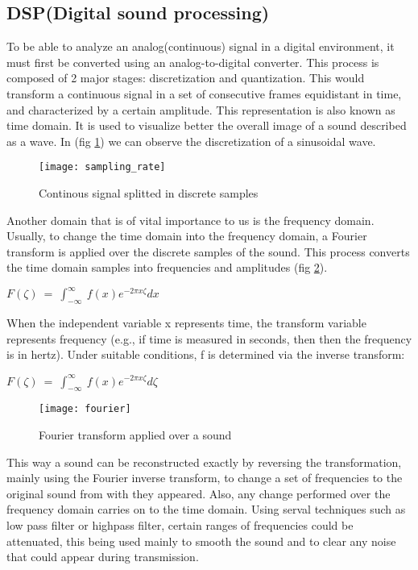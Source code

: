 \documentclass[12pt]{report}
\begin{document}
\subsection{DSP(Digital sound processing)}
To be able to analyze an analog(continuous) signal in a digital environment, it must first be converted using an analog-to-digital converter. This process is composed of 2 major stages: discretization and quantization. This would transform a continuous signal in a set of consecutive frames equidistant in time, and characterized by a certain amplitude. This representation is also known as time domain. It is used to visualize better the overall image of a sound described as a wave. In (fig \ref{fig:samp_rate}) we can observe the discretization of a sinusoidal wave.

\begin{figure}
\centering
\texttt{[image: sampling\_rate]}
\caption{Continous signal splitted in discrete samples}
\label{fig:samp_rate}
\end{figure}

Another domain that is of vital importance to us is the frequency domain. Usually, to change the time domain into the frequency domain, a Fourier transform is applied over the discrete samples of the sound. This process converts the time domain samples into frequencies and amplitudes (fig \ref{fig:fourier}).

\begin{center}
\begin{math}
F\left(\zeta \right)\:=\:\int _{-\infty }^{\infty }\:f\left(x\right)e^{-2\pi x\zeta }dx
\end{math}
\end{center}

When the independent variable x represents time, the transform variable represents frequency (e.g., if time is measured in seconds, then then the frequency is in hertz). Under suitable conditions, f is determined via the inverse transform: 
\begin{center}
\begin{math}
F\left(\zeta \right)\:=\:\int _{-\infty }^{\infty }\:f\left(x\right)e^{-2\pi x\zeta } d\zeta
\end{math}
\end{center}
\begin{figure}[!h]
\centering
\texttt{[image: fourier]}
\caption{Fourier transform applied over a sound}
\label{fig:fourier}
\end{figure}
This way a sound can be reconstructed exactly by reversing the transformation, mainly using the Fourier inverse transform, to change a set of frequencies to the original sound from with they appeared. Also, any change performed over the frequency domain carries on to the time domain. Using serval techniques such as low pass filter or highpass filter, certain ranges of frequencies could be attenuated, this being used mainly to smooth the sound and to clear any noise that could appear during transmission.
\end{document}
